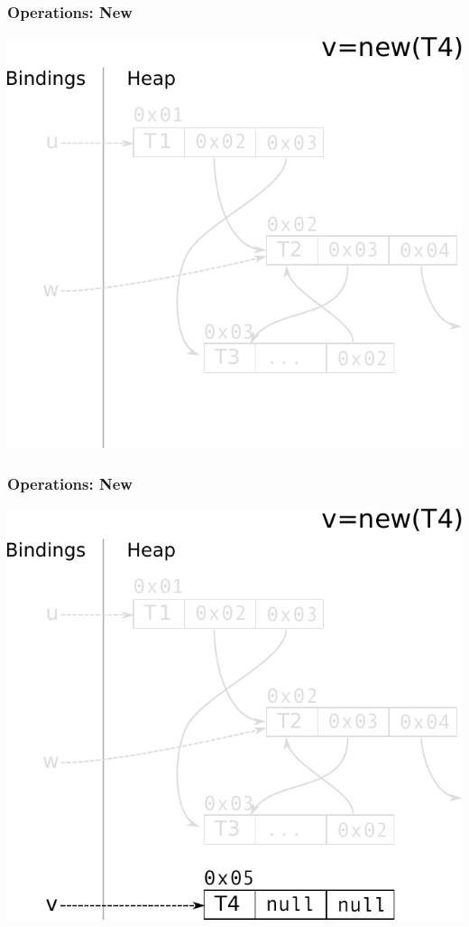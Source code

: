 \documentclass[utf8x]{beamer}
\begin{document}
\begin{frame}[plain]
  \frametitle{Operations: New}
    \includegraphics[scale=0.8]{figures/new01}
\end{frame}

\begin{frame}[plain]
  \frametitle{Operations: New}
  \includegraphics[scale=0.8]{figures/new02}
\end{frame}
\end{document}
